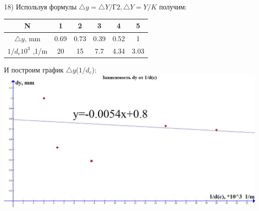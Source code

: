 \documentclass[a4paper,12pt]{article} %
\begin{document}
	
	18) Используя формулы $\bigtriangleup y=\bigtriangleup Y/Г2, \bigtriangleup Y=Y/K$ получим:\\
	\begin{center}
	
	\begin{tabular}{|c|c|c|c|c|c|}
	\hline 
	N & 1 & 2 & 3 & 4 & 5 \\ 
	\hline 
	$\bigtriangleup y$, mm & 0.69 & 0.73 & 0.39 & 0.52 & 1 \\ 
	\hline 
	$1/d_c 10^3$ ,1/m & 20 & 15 & 7.7 & 4.34 & 3.03\\
	\hline
	\end{tabular} 
		\end{center}
		И построим график $\bigtriangleup y$($1/d_c$):\\
		\includegraphics[scale=0.33]{4342}

	
	
	
	
	
	
	
	
	
	
	
	
	
	
	
\end{document}
